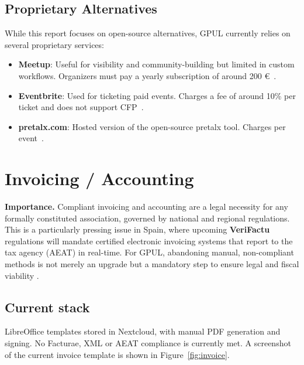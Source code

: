 \subsection*{Proprietary Alternatives}
While this report focuses on open-source alternatives, GPUL currently relies on several proprietary services:

\begin{itemize}
  \item \textbf{Meetup}: Useful for visibility and community-building but limited in custom workflows. Organizers must pay a yearly subscription of around 200 €~\cite{meetup-wiki}.
  \item \textbf{Eventbrite}: Used for ticketing paid events. Charges a fee of around 10\% per ticket and does not support CFP~\cite{eventbrite-wiki}.
  \item \textbf{pretalx.com}: Hosted version of the open-source pretalx tool. Charges per event~\cite{pretalx-pricing}.
\end{itemize}

\section{Invoicing / Accounting}

\textbf{Importance.} Compliant invoicing and accounting are a legal necessity for any formally constituted association, governed by national and regional regulations. This is a particularly pressing issue in Spain, where upcoming \textbf{VeriFactu} regulations will mandate certified electronic invoicing systems that report to the tax agency (AEAT) in real-time. For GPUL, abandoning manual, non-compliant methods is not merely an upgrade but a mandatory step to ensure legal and fiscal viability \cite{odoo-blog-verifactu}.

\subsection*{Current stack}
LibreOffice templates stored in Nextcloud, with manual PDF generation and signing. No Facturae, XML or AEAT compliance is currently met. A screenshot of the current invoice template is shown in Figure~\ref{fig:invoice}.

